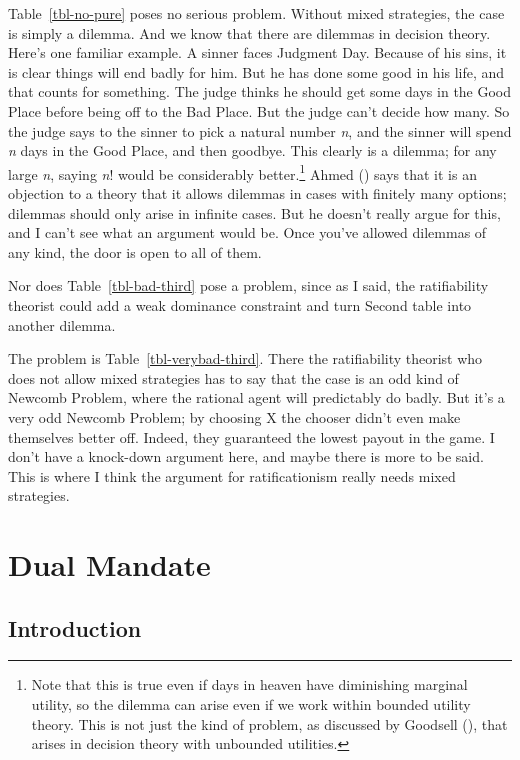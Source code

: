 \documentclass[
  12pt,
  letterpaper,
  DIV=11,
  numbers=noendperiod]{scrreprt}
\begin{document}
Table~\ref{tbl-no-pure} poses no serious problem. Without mixed
strategies, the case is simply a dilemma. And we know that there are
dilemmas in decision theory. Here's one familiar example. A sinner faces
Judgment Day. Because of his sins, it is clear things will end badly for
him. But he has done some good in his life, and that counts for
something. The judge thinks he should get some days in the Good Place
before being off to the Bad Place. But the judge can't decide how many.
So the judge says to the sinner to pick a natural number \emph{n}, and
the sinner will spend \emph{n} days in the Good Place, and then goodbye.
This clearly is a dilemma; for any large \emph{n}, saying \emph{n}!
would be considerably better.\footnote{Note that this is true even if
  days in heaven have diminishing marginal utility, so the dilemma can
  arise even if we work within bounded utility theory. This is not just
  the kind of problem, as discussed by Goodsell
  (), that arises in decision theory with
  unbounded utilities.} Ahmed () says that
it is an objection to a theory that it allows dilemmas in cases with
finitely many options; dilemmas should only arise in infinite cases. But
he doesn't really argue for this, and I can't see what an argument would
be. Once you've allowed dilemmas of any kind, the door is open to all of
them.

Nor does Table~\ref{tbl-bad-third} pose a problem, since as I said, the
ratifiability theorist could add a weak dominance constraint and turn
Second table into another dilemma.

The problem is Table~\ref{tbl-verybad-third}. There the ratifiability
theorist who does not allow mixed strategies has to say that the case is
an odd kind of Newcomb Problem, where the rational agent will
predictably do badly. But it's a very odd Newcomb Problem; by choosing X
the chooser didn't even make themselves better off. Indeed, they
guaranteed the lowest payout in the game. I don't have a knock-down
argument here, and maybe there is more to be said. This is where I think
the argument for ratificationism really needs mixed strategies.


\chapter{Dual Mandate}\label{sec-dual}

\section{Introduction}\label{sec-dual-introduction}
\end{document}
